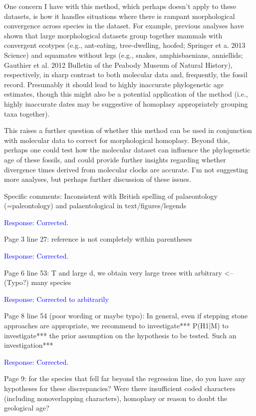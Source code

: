 \documentclass[11pt]{article}
\newcommand{\response}[1]{\medskip{}\textcolor{blue}{{Response: #1}}\medskip{}}
\begin{document}
One concern I have with this method, which perhaps doesn't apply to these datasets, is how it handles situations where there is rampant morphological convergence across species in the dataset. For example, previous analyses have shown that large morphological datasets group together mammals with convergent ecotypes (e.g., ant-eating, tree-dwelling, hoofed; Springer et a. 2013 Science) and squamates without legs (e.g., snakes, amphisbaenians, anniellids; Gauthier et al. 2012 Bulletin of the Peabody Museum of Natural History), respectively, in sharp contrast to both molecular data and, frequently, the fossil record. Presumably it should lead to highly inaccurate phylogenetic age estimates, though this might also be a potential application of the method (i.e., highly inaccurate dates may be suggestive of homoplasy appropriately grouping taxa together).

This raises a further question of whether this method can be used in conjunction with molecular data to correct for morphological homoplasy. Beyond this, perhaps one could test how the molecular dataset can influence the phylogenetic age of these fossils, and could provide further insights regarding whether divergence times derived from molecular clocks are accurate. I'm not suggesting more analyses, but perhaps further discussion of these issues.

Specific comments:
Inconsistent with British spelling of palaeontology (=paleontology) and palaentological in text/figures/legends

\response{Corrected.}

Page 3 line 27: reference is not completely within parentheses

\response{Corrected.}

Page 6 line 53: T and large d, we obtain very large trees with arbitrary <--(Typo?) many species

\response{Corrected to arbitrarily}

Page 8 line 54 (poor wording or maybe typo): In general, even if stepping stone approaches are appropriate, we recommend to investigate*** P(H1|M) to investigate*** the prior assumption on the hypothesis to be tested. Such an investigation***

\response{Corrected.}

Page 9: for the species that fell far beyond the regression line, do you have any hypotheses for these discrepancies? Were there insufficient coded characters (including nonoverlapping characters), homoplasy or reason to doubt the geological age?
\end{document}
